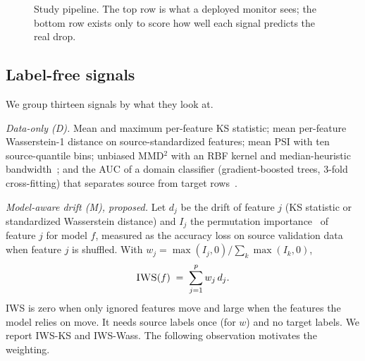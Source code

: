\documentclass[conference]{IEEEtran}
\theoremstyle{plainhead}
\newcommand{\iws}{\textsc{IWS}}
\begin{document}
\begin{figure}[t]
\centering
{}
\caption{Study pipeline. The top row is what a deployed monitor sees; the bottom row exists only to score how well each signal predicts the real drop.}
\label{fig:pipeline}
\end{figure}

\subsection{Label-free signals}
We group thirteen signals by what they look at.

\textit{Data-only (D).} Mean and maximum per-feature KS statistic; mean per-feature Wasserstein-1 distance on source-standardized features; mean PSI with ten source-quantile bins; unbiased MMD$^2$ with an RBF kernel and median-heuristic bandwidth~\cite{gretton2012kernel}; and the AUC of a domain classifier (gradient-boosted trees, 3-fold cross-fitting) that separates source from target rows~\cite{lopezpaz2017c2st,rabanser2019failing}.

\textit{Model-aware drift (M), proposed.} Let $d_j$ be the drift of feature $j$ (KS statistic or standardized Wasserstein distance) and $I_j$ the permutation importance~\cite{fisher2019all,breiman2001random} of feature $j$ for model $f$, measured as the accuracy loss on source validation data when feature $j$ is shuffled. With $w_j=\max(I_j,0)/\sum_k \max(I_k,0)$,
\begin{equation}
\iws(f) \;=\; \sum_{j=1}^{p} w_j\, d_j .
\label{eq:iws}
\end{equation}
\iws{} is zero when only ignored features move and large when the features the model relies on move. It needs source labels once (for $w$) and no target labels. We report \iws{}-KS and \iws{}-Wass. The following observation motivates the weighting.
\end{document}

